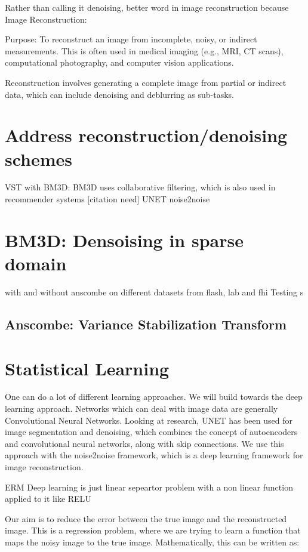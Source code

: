 
Rather than calling it denoising, better word in image reconstruction because
Image Reconstruction:

Purpose: To reconstruct an image from incomplete, noisy, or indirect measurements. This is often used in medical imaging (e.g., MRI, CT scans), computational photography, and computer vision applications. 

Reconstruction involves generating a complete image from partial or indirect data, which can include denoising and deblurring as sub-tasks.

\section{Address reconstruction/denoising schemes}
VST with BM3D: BM3D uses collaborative filtering, which is also used in recommender systems [citation need]
UNET noise2noise



\section{BM3D: Densoising in sparse domain}
with and without anscombe on different datasets from flash, lab and fhi
Testing s
\subsection{Anscombe: Variance Stabilization Transform}

\section{Statistical Learning}
One can do a lot of different learning approaches. We will build towards the deep learning approach. Networks which can deal with image data are generally Convolutional Neural Networks. Looking at research, UNET has been used for image segmentation and denoising, which combines the concept of autoencoders and convolutional neural networks, along with skip connections.
We use this approach with the noise2noise framework, which is a deep learning framework for image reconstruction.

ERM 
Deep learning is just linear sepeartor problem with a non linear function applied to it like RELU

Our aim is to reduce the error between the true image and the reconstructed image. This is a regression problem, where we are trying to learn a function that maps the noisy image to the true image. Mathematically, this can be written as:

